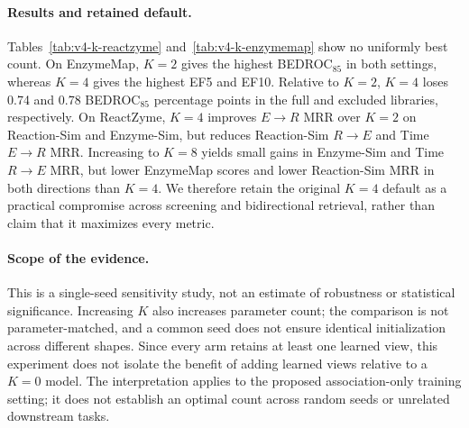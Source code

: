 \paragraph{Results and retained default.}
Tables~\ref{tab:v4-k-reactzyme} and~\ref{tab:v4-k-enzymemap} show no uniformly
best count. On EnzymeMap, $K=2$ gives the highest BEDROC$_{85}$ in both
settings, whereas $K=4$ gives the highest EF5 and EF10. Relative to $K=2$,
$K=4$ loses 0.74 and 0.78 BEDROC$_{85}$ percentage points in the full and
excluded libraries, respectively. On ReactZyme, $K=4$ improves
$E\!\to\!R$ MRR over $K=2$ on Reaction-Sim and Enzyme-Sim, but reduces
Reaction-Sim $R\!\to\!E$ and Time $E\!\to\!R$ MRR. Increasing to $K=8$
yields small gains in Enzyme-Sim and Time $R\!\to\!E$ MRR, but lower
EnzymeMap scores and lower Reaction-Sim MRR in both directions than $K=4$.
We therefore retain the original $K=4$ default as a practical compromise
across screening and bidirectional retrieval, rather than claim that it
maximizes every metric.

\paragraph{Scope of the evidence.}
This is a single-seed sensitivity study, not an estimate of robustness or
statistical significance. Increasing $K$ also increases parameter count;
the comparison is not parameter-matched, and a common seed does not ensure
identical initialization across different shapes. Since every arm retains
at least one learned view, this experiment does not isolate the benefit of
adding learned views relative to a $K=0$ model. The interpretation applies
to the proposed association-only training setting; it does not establish
an optimal count across random seeds or unrelated downstream tasks.
